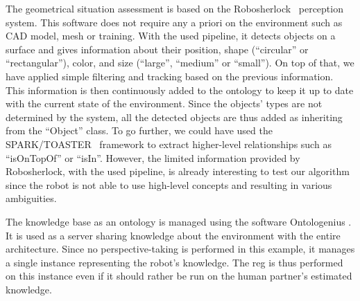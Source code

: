 The geometrical situation assessment is based on the Robosherlock~\cite{beetz_2015_robosherlock} perception system. This software does not require any a priori on the environment such as CAD model, mesh or training. With the used pipeline, it detects objects on a surface and gives information about their position, shape (``circular'' or ``rectangular''), color, and size (``large'', ``medium'' or ``small''). On top of that, we have applied simple filtering and tracking based on the previous information. This information is then continuously added to the ontology to keep it up to date with the current state of the environment. Since the objects' types are not determined by the system, all the detected objects are thus added as inheriting from the ``Object'' class. To go further, we could have used the SPARK/TOASTER~\cite{milliez_2014_framework} framework to extract higher-level relationships such as ``isOnTopOf'' or ``isIn''. However, the limited information provided by Robosherlock, with the used pipeline, is already interesting to test our algorithm since the robot is not able to use high-level concepts and resulting in various ambiguities.

The knowledge base as an ontology is managed using the software Ontologenius \cite{sarthou_2019_ontologenius}. It is used as a server sharing knowledge about the environment with the entire architecture. Since no perspective-taking is performed in this example, it manages a single instance representing the robot's knowledge. The \acrshort{reg} is thus performed on this instance even if it should rather be run on the human partner's estimated knowledge.

